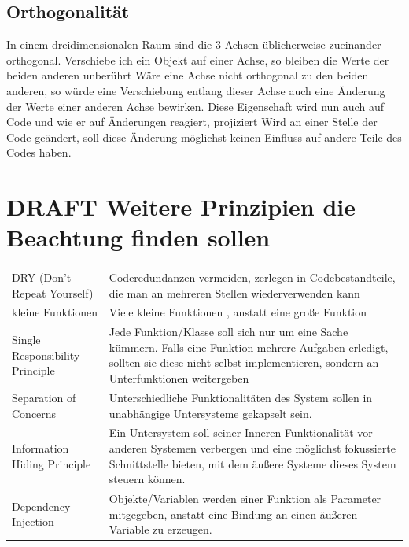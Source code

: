 \documentclass[a4paper,12pt,oneside]{book}
\begin{document}
\subsection{Orthogonalität}
\label{sec-1-2-4}
In einem dreidimensionalen Raum sind die 3 Achsen üblicherweise zueinander
orthogonal. Verschiebe ich ein Objekt auf einer Achse, so bleiben die Werte der
beiden anderen unberührt Wäre eine Achse nicht orthogonal zu den beiden anderen,
so würde eine Verschiebung entlang dieser Achse auch eine Änderung der Werte
einer anderen Achse bewirken. Diese Eigenschaft wird nun auch auf Code und wie
er auf Änderungen reagiert, projiziert
Wird an einer Stelle der Code geändert, soll diese Änderung möglichst keinen Einfluss auf
andere Teile des Codes haben.


\section{DRAFT Weitere Prinzipien die Beachtung finden sollen}
\label{sec-1-3}



\begin{center}
	

\bgroup
\def\arraystretch{1.5}%
\begin{tabularx}{\textwidth}{|p{5.5cm}|X|}
DRY  (Don't Repeat Yourself) & Coderedundanzen vermeiden, zerlegen in Codebestandteile, die man an mehreren Stellen wiederverwenden kann\\
kleine Funktionen & Viele kleine Funktionen , anstatt eine große Funktion\\
Single Responsibility Principle & Jede Funktion/Klasse soll sich nur um eine Sache kümmern. Falls eine Funktion mehrere Aufgaben erledigt, sollten sie diese nicht selbst implementieren, sondern an Unterfunktionen weitergeben\\
Separation of Concerns & Unterschiedliche Funktionalitäten des System sollen in unabhängige Untersysteme gekapselt sein.\\
Information Hiding Principle & Ein Untersystem soll seiner Inneren Funktionalität vor anderen Systemen verbergen und eine möglichst fokussierte Schnittstelle bieten, mit dem äußere Systeme dieses System steuern können.\\
Dependency Injection & Objekte/Variablen werden einer Funktion als Parameter mitgegeben, anstatt eine Bindung an einen äußeren Variable zu erzeugen.\\
		\end{tabularx}
\egroup

\end{center}
\end{document}
